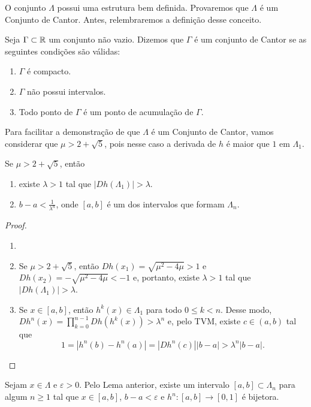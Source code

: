 O conjunto $\Lambda$ possui uma estrutura bem definida.
Provaremos que $\Lambda$ é um Conjunto de Cantor.
Antes, relembraremos a definição desse conceito.

\begin{definition}
Seja $\Gamma \subset \mathbb{R}$ um conjunto não vazio. Dizemos que $\Gamma$ é um conjunto de Cantor se as seguintes condições são válidas:
\begin{enumerate}[label=\roman*.]
\item $\Gamma$ é compacto.
\item $\Gamma$ não possui intervalos.
\item Todo ponto de $\Gamma$ é um ponto de acumulação de $\Gamma$.
\end{enumerate}
\end{definition}

Para facilitar a demonstração de que $\Lambda$ é um Conjunto de Cantor, vamos considerar que $\mu > 2 + \sqrt{5}$, pois nesse caso a derivada de $h$ é maior que $1$ em $\Lambda_1$.

\begin{lemma}
Se $\mu > 2 + \sqrt{5}$, então
\begin{enumerate}
\item  existe $\lambda > 1$ tal que $|D h(\Lambda_1)| > \lambda$.
\item $b - a < \frac{1}{\lambda^n}$, onde $[a, b]$ é um dos intervalos que formam $\Lambda_n$.
\end{enumerate}
\end{lemma}

\begin{proof}
\begin{enumerate}\item[]
\item Se $\mu > 2 + \sqrt{5}$, então $D h(x_1) = \sqrt{\mu^2 - 4\mu} > 1$ e $D h(x_2) = -\sqrt{\mu^2 - 4\mu} < -1$ e, portanto, existe $\lambda > 1$ tal que $|D h(\Lambda_1)| > \lambda$.
\item Se $x \in [a, b]$, então $h^k(x) \in \Lambda_1$ para todo $0 \leq k < n$.
Desse modo, $D h^n(x) = \prod_{k=0}^{n-1} D h(h^k(x)) > \lambda^n$ e, pelo TVM, existe $c \in (a, b)$ tal que
$$1 = |h^n(b) - h^n(a)| = |D h^n(c)||b - a| > \lambda^n|b - a|.$$
\end{enumerate}
\end{proof} 

Sejam $x \in \Lambda$ e $\varepsilon > 0$. Pelo Lema anterior,  existe um intervalo $[a, b] \subset \Lambda_n$ para algum $n \geq 1$ tal que $x \in [a, b]$, $b - a < \varepsilon$ e $h^n: [a, b] \to [0,1]$ é bijetora.

